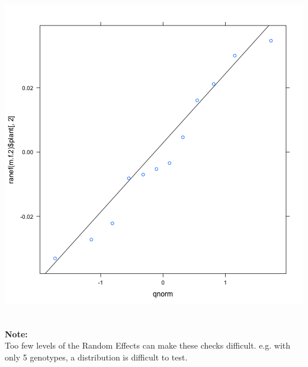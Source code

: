 \documentclass{beamer}
\begin{document}
\begin{frame}[fragile]
\begin{columns}
\begin{column}{0.5\textwidth}
            \includegraphics[width=\textwidth]{lectures/day_7_diagnostics_of_mems/figures/unnamed-chunk-19-1.png}
        \end{column}
    \end{columns}
\end{frame}


\begin{frame}[fragile]
    \frametitle{}
    \large\textbf{Note:}\\
    Too few levels of the Random Effects can make these checks difficult.
    \color{violet} e.g. with only 5 genotypes, a distribution is difficult to test.
\end{frame}
\end{document}

